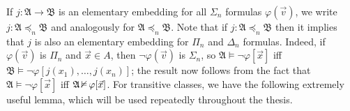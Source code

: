 If $j:\mathfrak{A}\to\mathfrak{B}$ is an elementary embedding for all $\Sigma_n$ formulas $\varphi(\vec{v})$, we write $j:\mathfrak{A}\preceq_n\mathfrak{B}$ and analogously for $\mathfrak{A}\preceq_n\mathfrak{B}$. Note that if $j:\mathfrak{A}\preceq_n\mathfrak{B}$ then it implies that $j$ is also an elementary embedding for $\Pi_n$ and $\Delta_n$ formulas. Indeed, if $\varphi(\vec{v})$ is $\Pi_n$ and $\vec{x}\in A$, then $\lnot\varphi(\vec{v})$ is $\Sigma_n$, so $\mathfrak{A}\models\lnot\varphi[\vec{x}]$ iff $\mathfrak{B}\models\lnot\varphi[j(x_1),\hdots,j(x_n)]$; the result now follows from the fact that $\mathfrak{A}\models\lnot\varphi[\vec{x}]$ iff $\mathfrak{A}\operatorname{\nvDash}\varphi[\vec{x}]$. For transitive classes, we have the following extremely useful lemma, which will be used repeatedly throughout the thesis.

